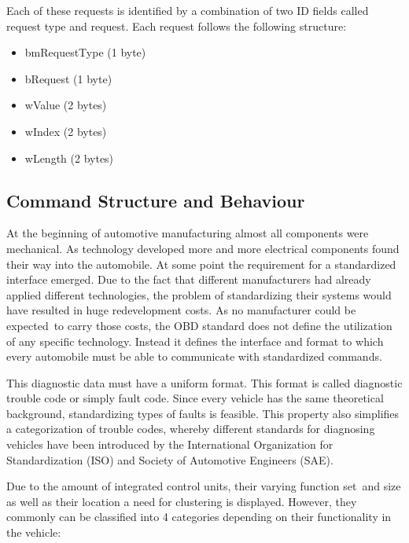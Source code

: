 {}

{Each of these requests is identified by a combination of two ID fields
called request type and request. Each request follows the following
structure:}

\begin{itemize}
\tightlist
\item
  {bmRequestType (1 byte)}
\item
  {bRequest (1 byte)}
\item
  {wValue (2 bytes)}
\item
  {wIndex (2 bytes)}
\item
  {wLength (2 bytes)}
\end{itemize}

{}

{}

\hypertarget{h.sukmqmhc4ldi}{\subsection{\texorpdfstring{{Command
Structure and
Behaviour}}{Command Structure and Behaviour}}\label{h.sukmqmhc4ldi}}

{At the beginning of automotive manufacturing almost all components were
mechanical. As technology developed more and more electrical components
found their way into the automobile. At some point the requirement for a
standardized interface emerged. Due to the fact that different
manufacturers had already applied different technologies, the problem of
standardizing their systems would have resulted in huge redevelopment
costs. As no manufacturer could be }{expected}{~to carry those costs,
the OBD standard does not define the utilization of any specific
technology. Instead it defines the interface and format to which every
automobile must be able to communicate with standardized commands. }

{This diagnostic data must have a uniform format. This format is called
diagnostic trouble code or simply fault code. Since every vehicle has
the same theoretical background, standardizing types of faults is
feasible. This property also simplifies a categorization of trouble
codes, whereby different standards for diagnosing vehicles have been
introduced by the International Organization for Standardization (ISO)
and Society of Automotive Engineers (SAE). }

{Due to the amount of integrated control units, their varying function
set}{~and }{size as well as their location a need for clustering is
displayed. However, they commonly can be classified into 4 categories
depending on their functionality in the vehicle:}

